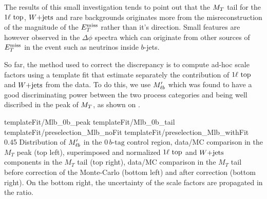     The results of this small investigation tends to point out that the $M_T$ tail for
    the $1\ell~\text{top}$, $\text{$W$+jets}$ and rare backgrounds originates more from the
    misreconstruction of the magnitude of the $E_T^\text{miss}$ rather than it's direction. Small
    features are however observed in the $\Delta \phi$ spectra which can originate from
    other sources of $E_T^\text{miss}$ in the event such as neutrinos inside $b$-jets.

    So far, the method used to correct the discrepancy is to compute ad-hoc scale factors
    using a template fit that estimate separately the contribution of $1\ell~\text{top}$ and
    $\text{$W$+jets}$ from the data. To do this, we use $M'_{\ell b}$ which was found to have a good
    discriminating power between the two process categories and being well discribed in
    the peak of $M_T$, as shown on .

                          {templateFit/Mlb_0b_peak}
                          {templateFit/Mlb_0b_tail}
                          {templateFit/preselection_Mlb_noFit}
                          {templateFit/preselection_Mlb_withFit}
                          {0.45}
                          {Distribution of $M'_{\ell b}$ in the $0\, b\text{-tag}$ control region, data/MC comparison in the $M_T$ peak (top left), superimposed and normalized $1\ell~\text{top}$ and $\text{$W$+jets}$ components in the $M_T$ tail (top right), data/MC comparison in the $M_T$ tail before correction of the Monte-Carlo (bottom left) and after correction (bottom right). On the bottom right, the uncertainty of the scale factors are propagated in the ratio.}

